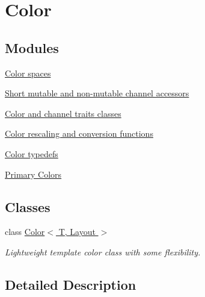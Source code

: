 \hypertarget{group___color}{\section{Color}
\label{group___color}
}
\subsection*{Modules}
\begin{DoxyCompactItemize}
\item 
\hyperlink{group___color_space}{Color spaces}
\item 
\hyperlink{group___channel_accessors}{Short mutable and non-\/mutable channel accessors}
\item 
\hyperlink{group___color_traits}{Color and channel traits classes}
\item 
\hyperlink{group___color_conversion}{Color rescaling and conversion functions}
\item 
\hyperlink{group___color_types}{Color typedefs}
\item 
\hyperlink{group___primary_colors}{Primary Colors}
\end{DoxyCompactItemize}
\subsection*{Classes}
\begin{DoxyCompactItemize}
\item 
class \hyperlink{class_d_o_1_1_color}{Color$<$ T, Layout $>$}
\begin{DoxyCompactList}\small\item\em Lightweight template color class with some flexibility. \end{DoxyCompactList}\end{DoxyCompactItemize}


\subsection{Detailed Description}
